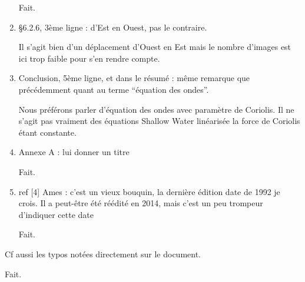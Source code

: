 \documentclass[10pt,a4paper]{article}
\begin{document}
\begin{enumerate}
{\color{blue} Fait.} 

\item §6.2.6, 3ème ligne : d’Est en Ouest, pas le contraire.

{\color{blue} Il s'agit bien d'un déplacement d'Ouest en Est mais le nombre d'images est ici trop faible pour s'en rendre compte.} 

\item Conclusion, 5ème ligne, et dans le résumé : même remarque que précédemment quant
au terme “équation des ondes”.

{\color{blue} Nous préférons parler d'équation des ondes avec paramètre de Coriolis. Il ne s'agit pas vraiment des équations Shallow Water linéarisée la force de Coriolis étant constante.} 

\item Annexe A : lui donner un titre

{\color{blue} Fait.} 


\item ref [4] Ames : c’est un vieux bouquin, la dernière édition date de 1992 je crois. Il a
peut-être été réédité en 2014, mais c’est un peu trompeur d’indiquer cette date

{\color{blue} Fait.} 










\end{enumerate}

Cf aussi les typos notées directement sur le document.

{\color{blue} Fait.} 
\end{document}
